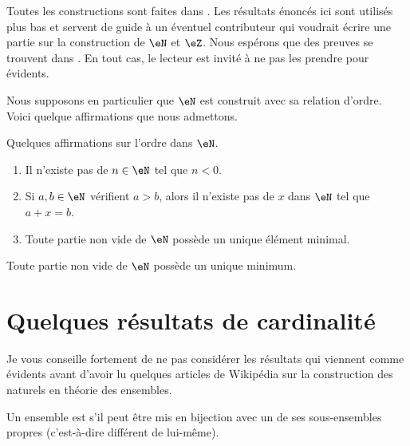 Toutes les constructions sont faites dans \cite{RWWJooJdjxEK}. Les résultats énoncés ici sont utilisés plus bas et servent de guide à un éventuel contributeur qui voudrait écrire une partie sur la construction de \( \eN\) et \( \eZ\). Nous espérons que des preuves se trouvent dans \cite{RWWJooJdjxEK}. En tout cas, le lecteur est invité à ne pas les prendre pour évidents.

Nous supposons en particulier que \( \eN\) est construit avec sa relation d'ordre. Voici quelque affirmations que nous admettons.

\begin{lemma}       \label{LEMooYMRJooYIAhBb}
    Quelques affirmations sur l'ordre dans \( \eN\).
    \begin{enumerate}
        \item
            Il n'existe pas de \( n\in \eN\) tel que \( n<0\).
        \item
            Si \( a,b\in \eN\) vérifient \( a>b\), alors il n'existe pas de \( x\) dans \( \eN\) tel que \( a+x=b\).
        \item       \label{ITEMooNHRIooODBVNK}
            Toute partie non vide de \( \eN\) possède un unique élément minimal.
    \end{enumerate}
\end{lemma}

\begin{lemma}       \label{LEMooFHEOooSHPGgU}
    Toute partie non vide de \( \eN\) possède un unique minimum.
\end{lemma}


\section{Quelques résultats de cardinalité}

Je vous conseille fortement de ne pas considérer les résultats qui viennent comme évidents avant d'avoir lu quelques articles de Wikipédia sur la construction des naturels en théorie des ensembles.

\begin{definition}      \label{DefEOZLooUMCzZR}
    Un ensemble est  s'il peut être mis en bijection avec un de ses sous-ensembles propres (c'est-à-dire différent de lui-même).
\end{definition}

